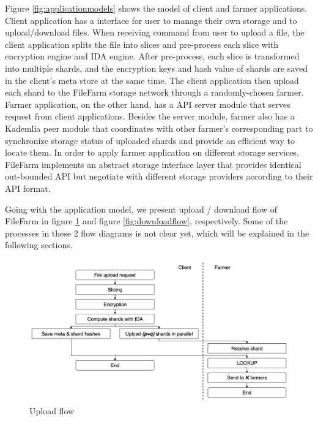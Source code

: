 Figure \ref{fig:applicationmodels} shows the model of client and farmer applications. Client application has a interface for user to manage their own storage and to upload/download files. When receiving command from user to upload a file, the client application splits the file into slices and pre-process each slice with encryption engine and IDA engine. After pre-process, each slice is transformed into multiple shards, and the encryption keys and hash value of shards are saved in the client's meta store at the same time. The client application then upload each shard to the FileFarm storage network through a randomly-chosen farmer. Farmer application, on the other hand, has a API server module that serves request from client applications. Besides the server module, farmer also has a Kademlia peer module that coordinates with other farmer's corresponding part to synchronize storage status of uploaded shards and provide an efficient way to locate them. In order to apply farmer application on different storage services, FileFarm implements an abstract storage interface layer that provides identical out-bounded API but negotiate with different storage providers according to their API format.

Going with the application model, we present upload / download flow of FileFarm in figure \ref{fig:uploadflow} and figure \ref{fig:downloadflow}, respectively. Some of the processes in these 2 flow diagrams is not clear yet, which will be explained in the following sections.

\newpage

\begin{figure}[hbt]
\centering
  \includegraphics[width=11.5cm]{figures/upload_flow.png}
  \caption{Upload flow}
  \label{fig:uploadflow}
\end{figure}

